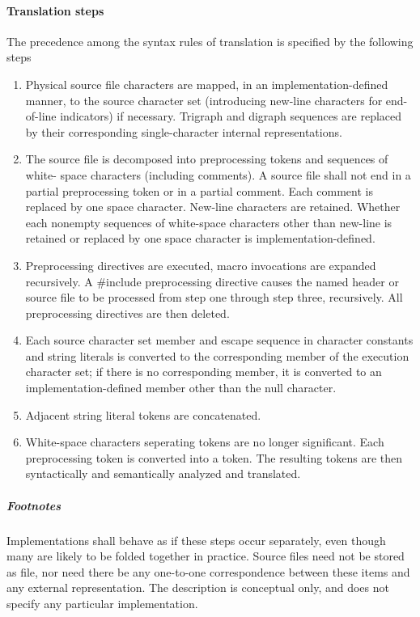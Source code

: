 \documentclass{article}
\begin{document}
\paragraph*{Translation steps}
The precedence among the syntax rules of translation is specified by the following steps
\begin{enumerate}
	\item Physical source file characters are mapped, in an implementation-defined manner,
	      to the source character set (introducing new-line characters for end-of-line
	      indicators) if necessary.  Trigraph and digraph sequences are replaced by their
	      corresponding single-character internal representations.
	\item The source file is decomposed into preprocessing tokens and sequences of white-
	      space characters (including comments). A source file shall not end in a partial
	      preprocessing token or in a partial comment. Each comment is replaced by one
	      space character. New-line characters are retained. Whether each nonempty
	      sequences of white-space characters other than new-line is retained or replaced
	      by one space character is implementation-defined.
	\item Preprocessing directives are executed, macro invocations are expanded 
	      recursively. A \#include preprocessing directive causes the named header or
	      source file to be processed from step one through step three, recursively. All
	      preprocessing directives are then deleted.
	\item Each source character set member and escape sequence in character constants and
	      string literals is converted to the corresponding member of the execution
	      character set; if there is no corresponding member, it is converted to an
	      implementation-defined member other than the null character.
	\item Adjacent string literal tokens are concatenated.
	\item White-space characters seperating tokens are no longer significant. Each
	      preprocessing token is converted into a token. The resulting tokens are then
	      syntactically and semantically analyzed and translated.	    		      
\end{enumerate}
\subparagraph*{Footnotes}
Implementations shall behave as if these steps occur separately, even though many are likely
to be folded together in practice. Source files need not be stored as file, nor need there
be any one-to-one correspondence between these items and any external representation. The
description is conceptual only, and does not specify any particular implementation.
\end{document}
